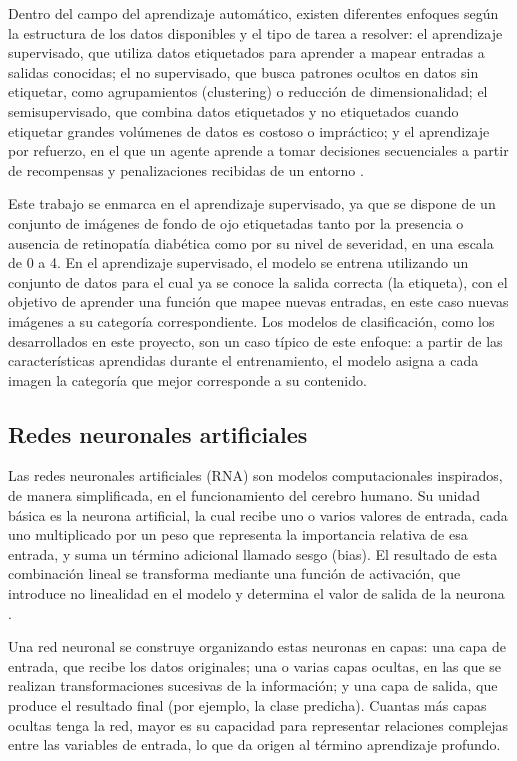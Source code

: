 Dentro del campo del aprendizaje automático, existen diferentes enfoques según la
estructura de los datos disponibles y el tipo de tarea a resolver: el aprendizaje
supervisado, que utiliza datos etiquetados para aprender a mapear entradas a salidas
conocidas; el no supervisado, que busca patrones ocultos en datos sin etiquetar, como
agrupamientos (clustering) o reducción de dimensionalidad; el semisupervisado, que
combina datos etiquetados y no etiquetados cuando etiquetar grandes volúmenes de datos es
costoso o impráctico; y el aprendizaje por refuerzo, en el que un agente aprende a tomar
decisiones secuenciales a partir de recompensas y penalizaciones recibidas de un entorno
.

Este trabajo se enmarca en el aprendizaje supervisado, ya que se dispone de un conjunto
de imágenes de fondo de ojo etiquetadas tanto por la presencia o ausencia de retinopatía
diabética como por su nivel de severidad, en una escala de 0 a 4. En el aprendizaje supervisado, el modelo se entrena
utilizando un conjunto de datos para el cual ya se conoce la salida correcta (la
etiqueta), con el objetivo de aprender una función que mapee nuevas entradas, en este
caso nuevas imágenes a su categoría correspondiente. Los modelos de clasificación,
como los desarrollados en este proyecto, son un caso típico de este enfoque: a partir de
las características aprendidas durante el entrenamiento, el modelo asigna a cada imagen
la categoría que mejor corresponde a su contenido.

\subsection{Redes neuronales artificiales}

Las redes neuronales artificiales (RNA) son modelos computacionales inspirados, de
manera simplificada, en el funcionamiento del cerebro humano. Su unidad básica es la
neurona artificial, la cual recibe uno o varios valores de entrada, cada uno multiplicado
por un peso que representa la importancia relativa de esa entrada, y suma un término
adicional llamado sesgo (bias). El resultado de esta combinación lineal se transforma
mediante una función de activación, que introduce no linealidad en el modelo y determina
el valor de salida de la neurona .

Una red neuronal se construye organizando estas neuronas en capas: una capa de entrada,
que recibe los datos originales; una o varias capas ocultas, en las que se realizan
transformaciones sucesivas de la información; y una capa de salida, que produce el
resultado final (por ejemplo, la clase predicha). Cuantas más capas ocultas tenga la red,
mayor es su capacidad para representar relaciones complejas entre las variables de
entrada, lo que da origen al término aprendizaje profundo.

